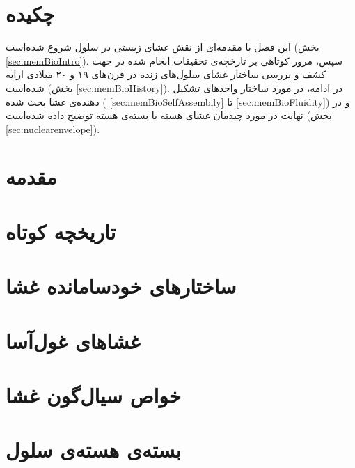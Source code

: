 \setRL
\clearpage

\def \MemBio {\Mempath /MembraneBio}

\section{
چکیده
}
این فصل با مقدمه‌ای از نقش غشای زیستی در سلول شروع شده‌است (بخش
\ref{sec:memBioIntro}).
 سپس، مرور کوتاهی بر تارخچه‌ی تحقیقات انجام شده در جهت کشف و بررسی ساختار غشای سلول‌های زنده در قرن‌های ۱۹ و ۲۰ میلادی ارايه شده‌است (بخش
\ref{sec:memBioHistory}).
در ادامه، در مورد ساختار واحد‌های تشکیل دهنده‌ی غشا بحث شده (
\ref{sec:memBioSelfAssembily}
تا
\ref{sec:memBioFluidity})
 و در نهایت در مورد چیدمان غشای هسته یا بسته‌ی هسته توضیح داده شده‌است (بخش
\ref{sec:nuclearenvelope}).
 
 
\section{\label{sec:memBioIntro}
مقدمه
}


\section{\label{sec:memBioHistory}
تاریخچه کوتاه
}


\section{\label{sec:memBioSelfAssembily}
ساختارهای خودسامانده غشا
}


\section{\label{sec:memBioGUVs}
غشاهای غول‌آسا
}


\section{\label{sec:memBioFluidity}
خواص سیال‌گون غشا
}


\section{\label{sec:nuclearenvelope}
بسته‌ی هسته‌ی سلول
}
